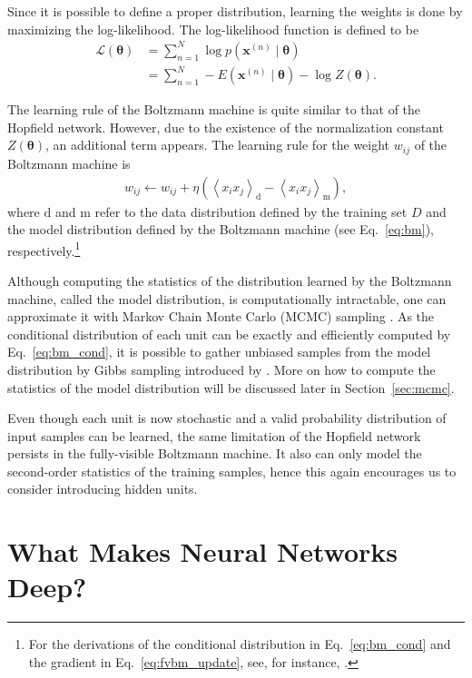 \documentclass{now}
\newcommand{\vect}[1]{\mathbf{#1}}
\newcommand{\vects}[1]{\boldsymbol{#1}}
\newcommand{\vx}[0]{\vect{x}}
\newcommand{\td}[0]{\text{d}}
\newcommand{\tf}[0]{\text{m}}
\newcommand{\TT}[0]{{\vects{\theta}}}
\newcommand{\LL}[0]{\mathcal{L}}
\begin{document}
Since it is possible to define a proper distribution,
learning the weights is done by maximizing the
log-likelihood. The log-likelihood function is defined to be
\begin{align}
    \label{eq:fvbm_ll}
    \LL(\TT) &= \sum_{n=1}^N \log p(\vx^{(n)} \mid \TT) 
    \nonumber
    \\
    &= \sum_{n=1}^N -E\left( \vx^{(n)} \mid \TT \right) -
    \log Z(\TT).
\end{align}

The learning rule of the Boltzmann machine is quite similar
to that of the Hopfield network. However, due to the
existence of the normalization constant $Z(\TT)$, an
additional term appears. The learning rule for the weight
$w_{ij}$ of the Boltzmann machine is
\begin{align}
    \label{eq:fvbm_update}
    w_{ij} \leftarrow w_{ij} + \eta \left( \left< x_i
    x_j\right>_\td - \left< x_i x_j \right>_\tf \right),
\end{align}
where $\td$ and $\tf$ refer to the data distribution defined
by the training set $D$ and the model distribution defined
by the Boltzmann machine (see Eq.~\eqref{eq:bm}),
respectively.\footnote{
For the derivations of the conditional distribution in
Eq.~\eqref{eq:bm_cond} and the gradient in
Eq.~\eqref{eq:fvbm_update}, see, for instance,
\citep{Cho2011t}.
}

Although computing the statistics of the distribution
learned by the Boltzmann machine, called the model distribution,
is computationally intractable, one can approximate it with
Markov Chain Monte Carlo (MCMC) sampling \citep[see,
e.g.,][]{Neal1993}.
As the conditional distribution of each unit can be exactly
and efficiently computed by Eq.~\eqref{eq:bm_cond}, it is
possible to gather unbiased samples from the model
distribution by Gibbs sampling introduced by
\citet{Geman1984}. More on how to compute the statistics of
the model distribution will be discussed later in
Section~\ref{sec:mcmc}.

Even though each unit is now stochastic and a valid probability
distribution of input samples can be learned, the same limitation
of the Hopfield network persists in the fully-visible Boltzmann
machine. It also can only model the second-order statistics of
the training samples, hence this again encourages us to consider
introducing hidden units.

\section{What Makes Neural Networks Deep?}
\label{sec:deep_conditions}
\end{document}
